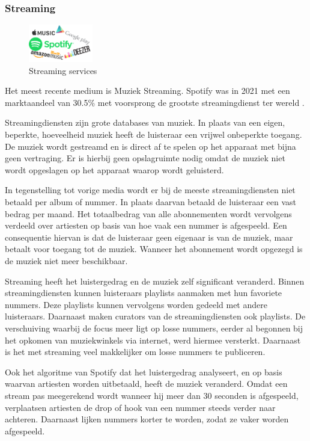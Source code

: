 \subsubsection*{Streaming}
\begin{figure}
    \centering
    \includegraphics[width=0.25\textwidth]{assets/critical-review/StreamingServices.png}
    \caption{Streaming services}
    \label{fig:critical-review:StreamingServices}
\end{figure}

Het meest recente medium is Muziek Streaming. Spotify was in 2021 met een marktaandeel van 30.5\% met voorsprong de grootste streamingdienst ter wereld \citep{mulligan2022marketshares}.

Streamingdiensten zijn grote databases van muziek. In plaats van een eigen, beperkte, hoeveelheid muziek heeft de luisteraar een vrijwel onbeperkte toegang. De muziek wordt gestreamd en is direct af te spelen op het apparaat met bijna geen vertraging. Er is hierbij geen opslagruimte nodig omdat de muziek niet wordt opgeslagen op het apparaat waarop wordt geluisterd.

In tegenstelling tot vorige media wordt er bij de meeste streamingdiensten niet betaald per album of nummer. In plaats daarvan betaald de luisteraar een vast bedrag per maand. Het totaalbedrag van alle abonnementen wordt vervolgens verdeeld over artiesten op basis van hoe vaak een nummer is afgespeeld. Een consequentie hiervan is dat de luisteraar geen eigenaar is van de muziek, maar betaalt voor toegang tot de muziek. Wanneer het abonnement wordt opgezegd is de muziek niet meer beschikbaar.

Streaming heeft het luistergedrag en de muziek zelf significant veranderd. Binnen streamingdiensten kunnen luisteraars playlists aanmaken met hun favoriete nummers. Deze playlists kunnen vervolgens worden gedeeld met andere luisteraars. Daarnaast maken curators van de streamingdiensten ook playlists. De verschuiving waarbij de focus meer ligt op losse nummers, eerder al begonnen bij het opkomen van muziekwinkels via internet, werd hiermee versterkt. Daarnaast is het met streaming veel makkelijker om losse nummers te publiceren.

Ook het algoritme van Spotify dat het luistergedrag analyseert, en op basis waarvan artiesten worden uitbetaald, heeft de muziek veranderd. Omdat een stream pas meegerekend wordt wanneer hij meer dan 30 seconden is afgespeeld, verplaatsen artiesten de drop of hook van een nummer steeds verder naar achteren. Daarnaast lijken nummers korter te worden, zodat ze vaker worden afgespeeld.

